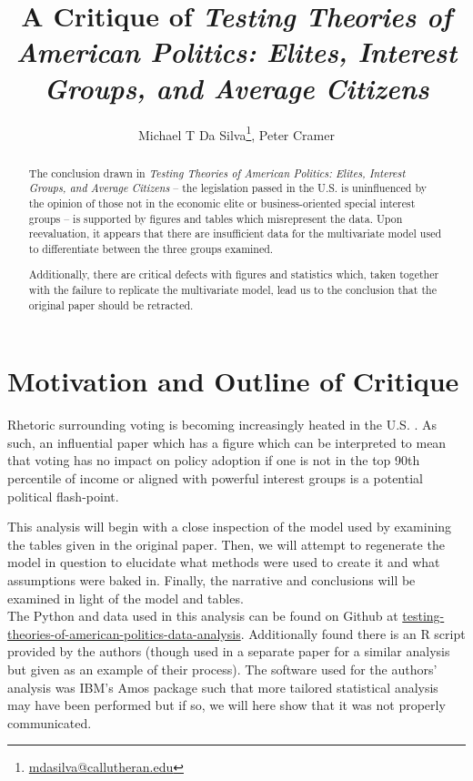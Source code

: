 \documentclass[]{article}
\title{A Critique of \textit{Testing Theories of American Politics: Elites, Interest Groups, and Average Citizens} \cite{gilens}}
\author{Michael T Da Silva\footnote{\href{mailto:mdasilva@callutheran.edu}{mdasilva@callutheran.edu}}, Peter Cramer}
\begin{document}
\maketitle

\begin{abstract}
	The conclusion drawn in \textit{Testing Theories of American Politics: Elites, Interest Groups, and Average Citizens} -- the legislation passed in the U.S. is uninfluenced by the opinion of those not in the economic elite or business-oriented special interest groups -- is supported by figures and tables which misrepresent the data. Upon reevaluation, it appears that there are insufficient data for the multivariate model used to differentiate between the three groups examined.
	
	Additionally, there are critical defects with figures and statistics which, taken together with the failure to replicate the multivariate model, lead us to the conclusion that the original paper should be retracted.

\end{abstract}

\section{Motivation and Outline of Critique}
Rhetoric surrounding voting is becoming increasingly heated in the U.S. \cite{voting_rights}. 
As such, an influential paper which has a figure which can be interpreted to mean that voting has no impact on policy adoption if one is not in the top 90th percentile of income or aligned with powerful interest groups is a potential political flash-point.

This analysis will begin with a close inspection of the model used by examining the tables given in the original paper.
Then, we will attempt to regenerate the model in question to elucidate what methods were used to create it and what assumptions were baked in.
Finally, the narrative and conclusions will be examined in light of the model and tables.\\

The Python and data used in this analysis can be found on Github at \href{https://github.com/ChemistryMickey/testing-theories-of-american-politics-data-analysis}{testing-theories-of-american-politics-data-analysis}. Additionally found there is an R script provided by the authors (though used in a separate paper for a similar analysis but given as an example of their process). The software used for the authors' analysis was IBM's Amos package such that more tailored statistical analysis may have been performed but if so, we will here show that it was not properly communicated.
\end{document}
